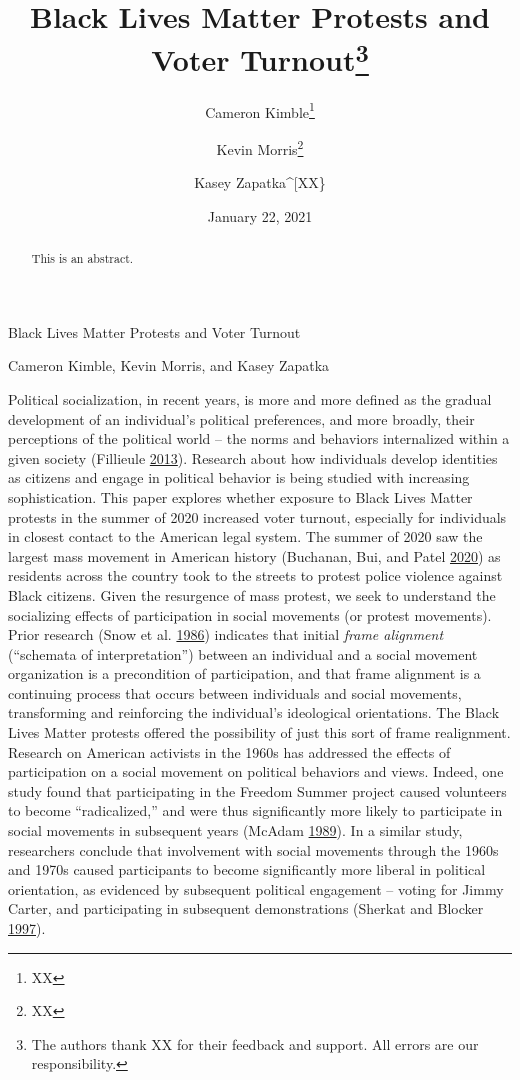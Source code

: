 \documentclass[
  12pt,
]{article}
\title{Black Lives Matter Protests and Voter Turnout\thanks{The authors thank XX for their feedback and support. All errors are our responsibility.}}
\author{Cameron Kimble\footnote{XX} \and Kevin Morris\footnote{XX} \and Kasey Zapatka\^{}{[}XX\}}
\date{January 22, 2021}
\begin{document}
\maketitle
\begin{abstract}
This is an abstract.
\end{abstract}

\pagebreak

\begin{center}
Black Lives Matter Protests and Voter Turnout

Cameron Kimble, Kevin Morris, and Kasey Zapatka
\end{center}

Political socialization, in recent years, is more and more defined as the gradual development of an individual's political preferences, and more broadly, their perceptions of the political world -- the norms and behaviors internalized within a given society (Fillieule \protect\hyperlink{ref-Fillieule2013}{2013}). Research about how individuals develop identities as citizens and engage in political behavior is being studied with increasing sophistication. This paper explores whether exposure to Black Lives Matter protests in the summer of 2020 increased voter turnout, especially for individuals in closest contact to the American legal system.
The summer of 2020 saw the largest mass movement in American history (Buchanan, Bui, and Patel \protect\hyperlink{ref-Buchanan2020}{2020}) as residents across the country took to the streets to protest police violence against Black citizens. Given the resurgence of mass protest, we seek to understand the socializing effects of participation in social movements (or protest movements). Prior research (Snow et al. \protect\hyperlink{ref-Snow1986}{1986}) indicates that initial \emph{frame alignment} (``schemata of interpretation'') between an individual and a social movement organization is a precondition of participation, and that frame alignment is a continuing process that occurs between individuals and social movements, transforming and reinforcing the individual's ideological orientations. The Black Lives Matter protests offered the possibility of just this sort of frame realignment.
Research on American activists in the 1960s has addressed the effects of participation on a social movement on political behaviors and views. Indeed, one study found that participating in the Freedom Summer project caused volunteers to become ``radicalized,'' and were thus significantly more likely to participate in social movements in subsequent years (McAdam \protect\hyperlink{ref-McAdam1989}{1989}). In a similar study, researchers conclude that involvement with social movements through the 1960s and 1970s caused participants to become significantly more liberal in political orientation, as evidenced by subsequent political engagement -- voting for Jimmy Carter, and participating in subsequent demonstrations (Sherkat and Blocker \protect\hyperlink{ref-Sherkat1997}{1997}).
\end{document}
